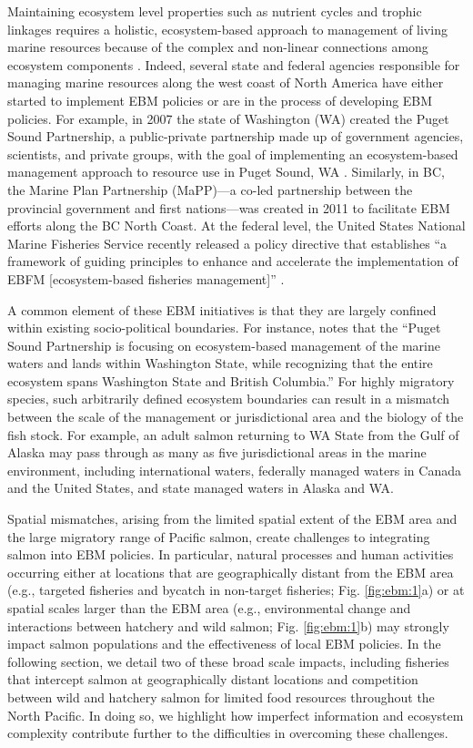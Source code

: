 Maintaining ecosystem level properties such as nutrient cycles and trophic
linkages requires a holistic, ecosystem-based approach to management of living
marine resources because of the complex and non-linear connections among
ecosystem components \citep{Engler2015}. Indeed, several state and federal
agencies responsible for managing marine resources along the west coast of North
America have either started to implement EBM policies or are in the process of
developing EBM policies. For example, in 2007 the state of Washington (WA)
created the Puget Sound Partnership, a public-private partnership made up of
government agencies, scientists, and private groups, with the goal of
implementing an ecosystem-based management approach to resource use in Puget
Sound, WA \citep{Ruckelshaus2009, Samhouri2011a}. Similarly, in BC, the Marine
Plan Partnership (MaPP)---a co-led partnership between the provincial government
and first nations---was created in 2011 to facilitate EBM efforts along the BC
North Coast. At the federal level, the United States National Marine Fisheries
Service recently released a policy directive that establishes ``a framework of
guiding principles to enhance and accelerate the implementation of EBFM
{[}ecosystem-based fisheries management{]}'' \citep{NMFS2016}.

A common element of these EBM initiatives is that they are largely confined
within existing socio-political boundaries. For instance,
\citet{Ruckelshaus2009} notes that the ``Puget Sound Partnership is focusing on
ecosystem-based management of the marine waters and lands within Washington
State, while recognizing that the entire ecosystem spans Washington State and
British Columbia.'' For highly migratory species, such arbitrarily defined
ecosystem boundaries can result in a mismatch between the scale of the
management or jurisdictional area and the biology of the fish stock. For
example, an adult salmon returning to WA State from the Gulf of Alaska may pass
through as many as five jurisdictional areas in the marine environment,
including international waters, federally managed waters in Canada and the
United States, and state managed waters in Alaska and WA.

Spatial mismatches, arising from the limited spatial extent of the EBM area and
the large migratory range of Pacific salmon, create challenges to integrating
salmon into EBM policies. In particular, natural processes and human activities
occurring either at locations that are geographically distant from the EBM area
(e.g., targeted fisheries and bycatch in non-target fisheries; Fig.
\ref{fig:ebm:1}a) or at spatial scales larger than the EBM area (e.g.,
environmental change and interactions between hatchery and wild salmon; Fig.
\ref{fig:ebm:1}b) may strongly impact salmon populations and the effectiveness
of local EBM policies. In the following section, we detail two of these broad
scale impacts, including fisheries that intercept salmon at geographically
distant locations and competition between wild and hatchery salmon for limited
food resources throughout the North Pacific. In doing so, we highlight how
imperfect information and ecosystem complexity contribute further to the
difficulties in overcoming these challenges.

